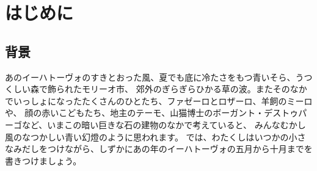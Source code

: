 \chapter{はじめに}
 \section{背景}
 あのイーハトーヴォのすきとおった風、夏でも底に冷たさをもつ青いそら、うつくしい森で飾られたモリーオ市、
 郊外のぎらぎらひかる草の波。またそのなかでいっしょになったたくさんのひとたち、ファゼーロとロザーロ、羊飼のミーロや、
 顔の赤いこどもたち、地主のテーモ、山猫博士のボーガント・デストゥパーゴなど、いまこの暗い巨きな石の建物のなかで考えていると、
 みんなむかし風のなつかしい青い幻燈のように思われます。
 では、わたくしはいつかの小さなみだしをつけながら、しずかにあの年のイーハトーヴォの五月から十月までを書きつけましょう。